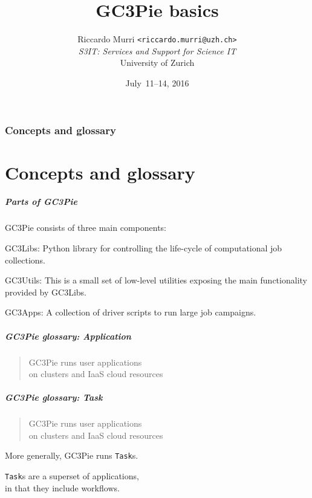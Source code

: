 \documentclass[english,serif,mathserif,xcolor=pdftex,dvipsnames,table]{beamer}
\title[Introduction]{%
  GC3Pie basics
}
\author[R. Murri, S3IT UZH]{%
  Riccardo Murri \texttt{<riccardo.murri@uzh.ch>}
  \\[1ex]
  \emph{S3IT: Services and Support for Science IT}
  \\[1ex]
  University of Zurich
}
\date{July~11--14, 2016}
\begin{document}
\maketitle

\section{Concepts and glossary}
\part{Concepts and glossary}

\begin{frame}
\frametitle{Parts of GC3Pie}

  GC3Pie consists of three main components:

  \begin{block}{GC3Libs:} Python library for controlling the life-cycle of computational job collections. \end{block}
  \begin{block}{GC3Utils:} This is a small set of low-level utilities exposing the main functionality provided by GC3Libs. \end{block}
  \begin{block}{GC3Apps:} A collection of driver scripts to run large job campaigns. \end{block}
\end{frame}

\begin{frame}
  \frametitle{GC3Pie glossary: Application}
  \begin{quote}
    GC3Pie runs \alert<2-3>{user applications}
    \\
    on clusters and IaaS cloud resources
  \end{quote}

\end{frame}


\begin{frame}
  \frametitle{GC3Pie glossary: Task}
  \begin{quote}
    GC3Pie \alert{runs} user applications
    \\
    on clusters and IaaS cloud resources
  \end{quote}

  \+ More generally, GC3Pie runs \texttt{Task}s.

  \+ \texttt{Task}s are a superset of applications,
  \\ in that they include workflows.

\end{frame}
\end{document}
